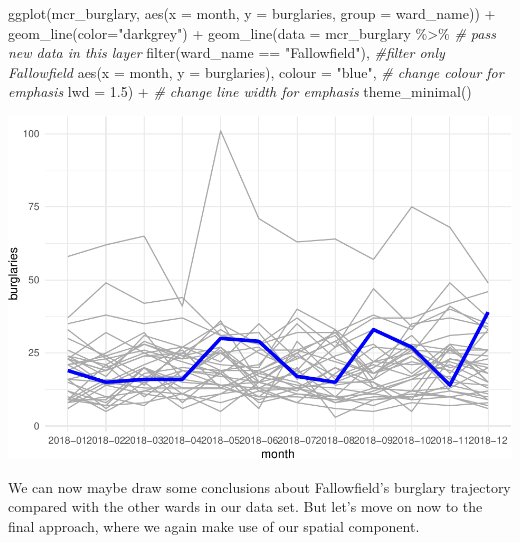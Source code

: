\documentclass[
]{book}
\makeatletter
\newenvironment{Shaded}{\begin{snugshade}}{\end{snugshade}}
\newcommand{\AttributeTok}[1]{\textcolor[rgb]{0.61,0.61,0.61}{#1}}
\newcommand{\CommentTok}[1]{\textcolor[rgb]{0.37,0.37,0.37}{\textit{#1}}}
\newcommand{\FloatTok}[1]{\textcolor[rgb]{0.06,0.06,0.06}{#1}}
\newcommand{\FunctionTok}[1]{\textcolor[rgb]{0,0,0}{#1}}
\newcommand{\NormalTok}[1]{#1}
\newcommand{\SpecialCharTok}[1]{\textcolor[rgb]{0,0,0}{#1}}
\newcommand{\StringTok}[1]{\textcolor[rgb]{0.5,0.5,0.5}{#1}}
\newenvironment{kframe}{%
\medskip{}
\setlength{\fboxsep}{.8em}
 \def\at@end@of@kframe{}%
 \ifinner\ifhmode%
  \def\at@end@of@kframe{\end{minipage}}%
  \begin{minipage}{\columnwidth}%
 \fi\fi%
 \def\FrameCommand##1{\hskip\@totalleftmargin \hskip-\fboxsep
 \colorbox{shadecolor}{##1}\hskip-\fboxsep
     \hskip-\linewidth \hskip-\@totalleftmargin \hskip\columnwidth}%
 \MakeFramed {\advance\hsize-\width
   \@totalleftmargin\z@ \linewidth\hsize
   \@setminipage}}%
 {\par\unskip\endMakeFramed%
 \at@end@of@kframe}
\renewenvironment{Shaded}{\begin{kframe}}{\end{kframe}}
\makeatother
\begin{document}
\begin{Shaded}
\begin{Highlighting}[]
\FunctionTok{ggplot}\NormalTok{(mcr\_burglary, }
       \FunctionTok{aes}\NormalTok{(}\AttributeTok{x =}\NormalTok{ month, }
           \AttributeTok{y =}\NormalTok{ burglaries, }
           \AttributeTok{group =}\NormalTok{ ward\_name)) }\SpecialCharTok{+} 
  \FunctionTok{geom\_line}\NormalTok{(}\AttributeTok{color=}\StringTok{"darkgrey"}\NormalTok{) }\SpecialCharTok{+} 
  \FunctionTok{geom\_line}\NormalTok{(}\AttributeTok{data =}\NormalTok{ mcr\_burglary }\SpecialCharTok{\%\textgreater{}\%}    \CommentTok{\# pass new data in this layer}
              \FunctionTok{filter}\NormalTok{(ward\_name }\SpecialCharTok{==} \StringTok{"Fallowfield"}\NormalTok{),  }\CommentTok{\#filter only Fallowfield }
            \FunctionTok{aes}\NormalTok{(}\AttributeTok{x =}\NormalTok{ month, }
           \AttributeTok{y =}\NormalTok{ burglaries), }
           \AttributeTok{colour =} \StringTok{"blue"}\NormalTok{,  }\CommentTok{\# change colour for emphasis}
           \AttributeTok{lwd =} \FloatTok{1.5}\NormalTok{) }\SpecialCharTok{+} \CommentTok{\# change line width for emphasis}
  \FunctionTok{theme\_minimal}\NormalTok{()}
\end{Highlighting}
\end{Shaded}

\includegraphics{crime_mapping_files/figure-latex/unnamed-chunk-183-1.pdf}

We can now maybe draw some conclusions about Fallowfield's burglary trajectory compared with the other wards in our data set. But let's move on now to the final approach, where we again make use of our spatial component.
\end{document}

